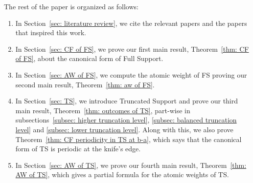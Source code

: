 \documentclass[oneside,reqno]{amsart}
\begin{document}

The rest of the paper is organized as follows:\begin{enumerate}
    \item In Section~\ref{sec: literature review}, we cite the relevant papers and the papers that inspired this work.
    \item In Section~\ref{sec: CF of FS}, we prove our first main result, Theorem~\ref{thm: CF of FS}, about the canonical form of {\sc Full Support}.
    \item In Section~\ref{sec: AW of FS}, we compute the atomic weight of {\sc FS} proving our second main result, Theorem~\ref{thm: aw of FS}.
    \item In Section~\ref{sec: TS}, we introduce {\sc Truncated Support} and prove our third main result, Theorem~\ref{thm: outcomes of TS}, part-wise in subsections~\ref{subsec: higher truncation level}, \ref{subsec: balanced truncation level} and \ref{subsec: lower truncation level}. Along with this, we also prove Theorem~\ref{thm: CF periodicity in TS at b-a}, which says that the canonical form of {\sc TS} is periodic at the knife's edge.
    
    \item In Section~\ref{sec: AW of TS}, we prove our fourth main result, Theorem~\ref{thm: AW of TS}, which gives a partial formula for the atomic weights of {\sc TS}. 
\end{enumerate}

\end{document}
